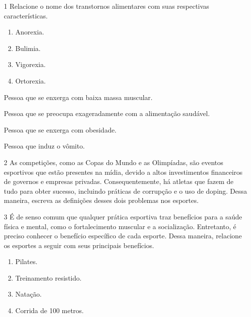 \num{1}  Relacione o nome dos transtornos alimentares com suas respectivas características.

\begin{enumerate}
\item Anorexia.

\item Bulimia.

\item Vigorexia.

\item Ortorexia.
\end{enumerate}

\begin{boxlist}
 Pessoa que se enxerga com baixa massa muscular.

 Pessoa que se preocupa exageradamente com a alimentação saudável.

 Pessoa que se enxerga com obesidade.

 Pessoa que induz o vômito.
\end{boxlist}


\num{2} As competições, como as Copas do Mundo e as Olimpíadas, são
eventos esportivos que estão presentes na mídia, devido a altos
investimentos financeiros de governos e empresas privadas.
Consequentemente, há atletas que fazem de tudo para obter sucesso, 
incluindo práticas de corrupção e o uso de doping. Dessa maneira, 
escreva as definições desses dois problemas nos esportes.



\num{3} É de senso comum que qualquer prática esportiva traz benefícios 
para a saúde física e mental, como o fortalecimento muscular e a
socialização. Entretanto, é preciso conhecer o benefício específico de
cada esporte. Dessa maneira, relacione os esportes a seguir com seus 
principais benefícios.

\begin{enumerate}
\item Pilates.

\item Treinamento resistido.

\item Natação.

\item Corrida de 100 metros.
\end{enumerate}

